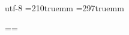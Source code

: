 \relax

\XeTeXdefaultencoding utf-8
\pdfpagewidth=210truemm\relax
\pdfpageheight=297truemm\relax



\let\LMTone\relax



\headline={\hfill}\footline={\hfill}%

\def\swap#1#2{\let\temp#1\let#1#2\let#2\temp}
\swap\epsilon\varepsilon
\swap\theta\vartheta
\swap\rho\varrho

\def\e{{\rm e}} 
\def\log{\mathop{\rm log}\nolimits}

\def\ch{\mathop{\rm ch}\nolimits}
\def\sh{\mathop{\rm sh}\nolimits}
\def\th{\mathop{\rm th}\nolimits}

\def\argch{\mathop{\rm Argch}\nolimits}
\def\argsh{\mathop{\rm Argsh}\nolimits}
\def\argth{\mathop{\rm Argth}\nolimits}

\def\arccos{\mathop{\rm Arccos}\nolimits}
\def\arcsin{\mathop{\rm Arcsin}\nolimits}
\def\arctan{\mathop{\rm Arctan}\nolimits}

\def\cotan{\mathop{\rm cotan}\nolimits}

\def\re{{\Re e\ }}
\def\im{{\Im m\ }}

\def\Sim{\mathop{\sim}}
\def\grad{\mathop{\rm grad}\nolimits}
\def\gradv{\mathop{\overrightarrow{\rm grad}}\nolimits}

\def\card{\mathop{\rm card}\nolimits}
\def\dim{\mathop{\rm dim}\nolimits}
\def\det{\mathop{\rm dét}\nolimits}
\def\mod{\mathop{\rm mod}\nolimits}

\endinput
                
                \\paperwidth=210truemm\\relax
                \\paperheight=297truemm\\relax